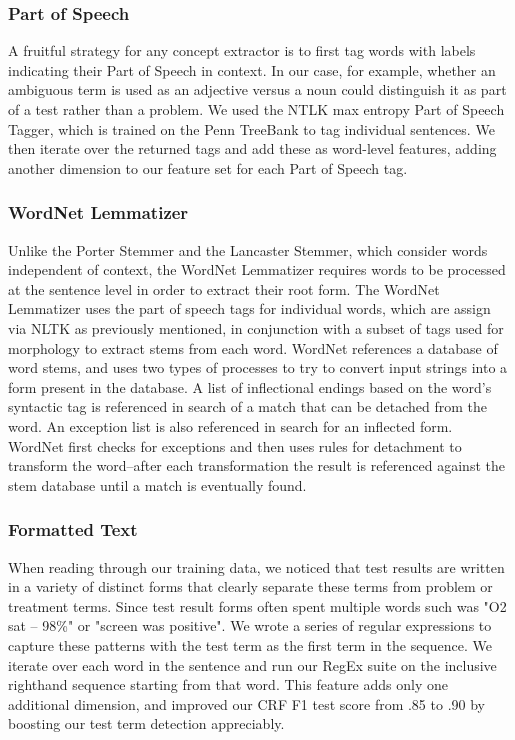 \documentclass[preprint]{style}
\begin{document}
\subsubsection{Part of Speech}
A fruitful strategy for any concept extractor is to first tag words with labels indicating their Part of Speech in context. In our case, for example, whether an ambiguous term is used as an adjective versus a noun could distinguish it as part of a test rather than a problem. We used the NTLK max entropy Part of Speech Tagger, which is trained on the Penn TreeBank to tag individual sentences. We then iterate over the returned tags and add these as word-level features, adding another dimension to our feature set for each Part of Speech tag.

\subsubsection{WordNet Lemmatizer}
Unlike the Porter Stemmer and the Lancaster Stemmer, which consider words independent of context, the WordNet Lemmatizer requires words to be processed at the sentence level in order to extract their root form. The WordNet Lemmatizer uses the part of speech tags for individual words, which are assign via NLTK as previously mentioned, in conjunction with a subset of tags used for morphology to extract stems from each word. WordNet references a database of word stems, and uses two types of processes to try to convert input strings into a form present in the database. A list of inflectional endings based on the word's syntactic tag is referenced in search of a match that can be detached from the word. An exception list is also referenced in search for an inflected form. WordNet first checks for exceptions and then uses rules for detachment to transform the word--after each transformation the result is referenced against the stem database until a match is eventually found.

\subsubsection{Formatted Text}
When reading through our training data, we noticed that test results are written in a variety of distinct forms that clearly separate these terms from problem or treatment terms. Since test result forms often spent multiple words such was "O2 sat -- 98\%" or "screen was positive". We wrote a series of regular expressions to capture these patterns with the test term as the first term in the sequence. We iterate over each word in the sentence and run our RegEx suite on the inclusive righthand sequence starting from that word. This feature adds only one additional dimension, and improved our CRF F1 test score from .85 to .90 by boosting our test term detection appreciably.
\end{document}
